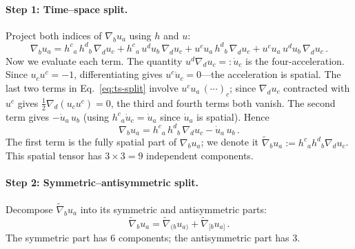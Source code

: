\paragraph{Step 1: Time--space split.}
Project both indices of $\nabla_b u_a$ using $h$ and $u$:
\begin{equation}\label{eq:ts-split}
\nabla_b u_a
= h^c{}_a\, h^d{}_b\, \nabla_d u_c
  + h^c{}_a\, u^d u_b\, \nabla_d u_c
  + u^c u_a\, h^d{}_b\, \nabla_d u_c
  + u^c u_a\, u^d u_b\, \nabla_d u_c\,.
\end{equation}
Now we evaluate each term.  The quantity
$u^d \nabla_d u_c =: \dot{u}_c$ is the four-acceleration.
Since $u_c u^c = -1$, differentiating gives
$u^c \dot{u}_c = 0$---the acceleration is spatial.  The
last two terms in Eq.~\eqref{eq:ts-split} involve
$u^c u_a \,(\cdots)_c$; since $\nabla_d u_c$ contracted with
$u^c$ gives $\frac{1}{2}\nabla_d(u_c u^c) = 0$, the third and
fourth terms both vanish.  The second term gives
$- \dot{u}_a\, u_b$ (using $h^c{}_a \dot{u}_c = \dot{u}_a$
since $\dot{u}_a$ is spatial).  Hence
\begin{equation}\label{eq:ts-result}
\nabla_b u_a
= h^c{}_a\, h^d{}_b\, \nabla_d u_c
  - \dot{u}_a\, u_b\,.
\end{equation}
The first term is the fully spatial part of $\nabla_b u_a$; we
denote it $\tilde{\nabla}_b u_a := h^c{}_a h^d{}_b \nabla_d u_c$.
This spatial tensor has $3 \times 3 = 9$ independent components.

\paragraph{Step 2: Symmetric--antisymmetric split.}
Decompose $\tilde{\nabla}_b u_a$ into its symmetric and
antisymmetric parts:
\begin{equation}
\tilde{\nabla}_b u_a
= \tilde{\nabla}_{(b} u_{a)}
  + \tilde{\nabla}_{[b} u_{a]}\,.
\end{equation}
The symmetric part has $6$ components; the antisymmetric part
has $3$.

